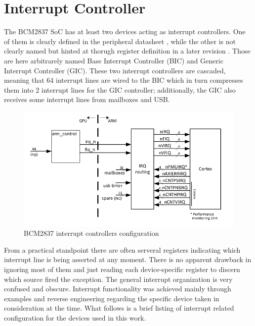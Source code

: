 \documentclass[12pt,a4paper,openright,twoside]{report}
\begin{document}
\section{Interrupt Controller}
\label{gic}
The BCM2837 SoC has at least two devices acting as interrupt controllers. One of 
them is clearly defined in the peripheral datasheet \cite{bcm2835}, while the
other is not clearly named but hinted at thorugh register definition in a later 
revision \cite{rev3.4}. Those are here arbitrarely named Base Interrupt Controller (BIC)
and Generic Interrupt Controller (GIC).
These two interrupt controllers are cascaded, meaning that 64 interrupt lines are 
wired to the BIC which in turn compresses them into 2 interrupt lines for the GIC
controller; additionally, the GIC also receives some interrupt lines from mailboxes
and USB.

 \begin{figure}[h]
 \includegraphics[scale=0.55]{tesi3.png}
 \caption[Figure 3]{BCM2837 interrupt controllers configuration}\label{fig:interrupt}
 \end{figure}
From a practical standpoint there are often serveral registers indicating which interrupt
line is being asserted at any moment. There is no apparent drawback in ignoring most
of them and just reading each device-specific register to discern which source fired
the exception.
The general interrupt organization is very confused and obscure. Interrupt functionality
was achieved mainly through examples and reverse engineering regarding the specific
device taken in consideration at the time.
What follows is a brief listing of interrupt related configuration for the devices
used in this work.
\end{document}

